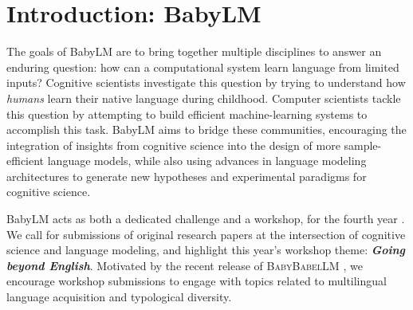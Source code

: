 \documentclass[11pt]{article}
\begin{document}
\section{Introduction: BabyLM  %
    }

The goals of BabyLM are to bring together multiple disciplines to answer an enduring question: how can a computational system learn language from limited inputs? Cognitive scientists investigate this question by trying to understand how \emph{humans} learn their native language during childhood. Computer scientists tackle this question by attempting to build efficient machine-learning systems to accomplish this task.
BabyLM aims to bridge these communities, encouraging the integration of insights from cognitive science into the design of more sample-efficient language models, while also using advances in language modeling architectures to generate new hypotheses and experimental paradigms for cognitive science.

BabyLM acts as both a dedicated challenge and a workshop, for the fourth year \citep{warstadt-etal-2023-findings,conll-2024-babylm,charpentier-etal-2025-findings}. We call for submissions of original research papers at the intersection of cognitive science and language modeling, and highlight this year's workshop theme: \textbf{\textit{Going beyond English}}.
Motivated by the recent release of \textsc{BabyBabelLM} \citep{DBLP:journals/corr/abs-2510-10159}, we encourage workshop submissions to engage with topics related to multilingual language acquisition and typological diversity.
\end{document}

